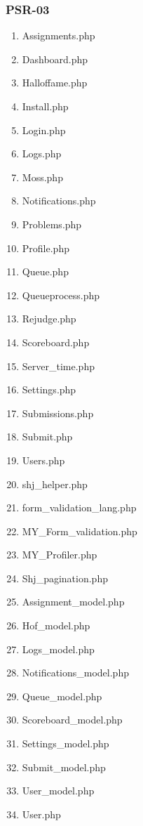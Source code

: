 \subsubsection{PSR-03}
\begin{enumerate}
	\item Assignments.php
	\item Dashboard.php
	\item Halloffame.php
	\item Install.php
	\item Login.php
	\item Logs.php
	\item Moss.php
	\item Notifications.php
	\item Problems.php
	\item Profile.php
	\item Queue.php
	\item Queueprocess.php
	\item Rejudge.php
	\item Scoreboard.php
	\item Server\_time.php
	\item Settings.php
	\item Submissions.php
	\item Submit.php
	\item Users.php
	\item shj\_helper.php
	\item form\_validation\_lang.php
	\item MY\_Form\_validation.php
	\item MY\_Profiler.php
	\item Shj\_pagination.php
	\item Assignment\_model.php
	\item Hof\_model.php
	\item Logs\_model.php
	\item Notifications\_model.php
	\item Queue\_model.php
	\item Scoreboard\_model.php
	\item Settings\_model.php
	\item Submit\_model.php
	\item User\_model.php
	\item User.php
\end{enumerate}


